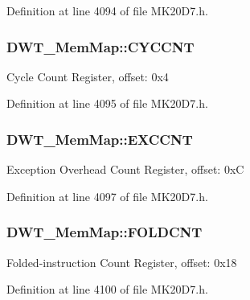 Definition at line 4094 of file M\+K20\+D7.\+h.

\subsubsection[{\texorpdfstring{C\+Y\+C\+C\+NT}{CYCCNT}}]{ D\+W\+T\+\_\+\+Mem\+Map\+::\+C\+Y\+C\+C\+NT}\hypertarget{struct_d_w_t___mem_map_adf38ec6a1c7381ff5e894b4f2fc2af1e}{}\label{struct_d_w_t___mem_map_adf38ec6a1c7381ff5e894b4f2fc2af1e}
Cycle Count Register, offset\+: 0x4 

Definition at line 4095 of file M\+K20\+D7.\+h.

\subsubsection[{\texorpdfstring{E\+X\+C\+C\+NT}{EXCCNT}}]{ D\+W\+T\+\_\+\+Mem\+Map\+::\+E\+X\+C\+C\+NT}\hypertarget{struct_d_w_t___mem_map_ae76c95a5c70db8790d92dbf9e404e3aa}{}\label{struct_d_w_t___mem_map_ae76c95a5c70db8790d92dbf9e404e3aa}
Exception Overhead Count Register, offset\+: 0xC 

Definition at line 4097 of file M\+K20\+D7.\+h.

\subsubsection[{\texorpdfstring{F\+O\+L\+D\+C\+NT}{FOLDCNT}}]{ D\+W\+T\+\_\+\+Mem\+Map\+::\+F\+O\+L\+D\+C\+NT}\hypertarget{struct_d_w_t___mem_map_a74e31352303671690d8a8e173fae836e}{}\label{struct_d_w_t___mem_map_a74e31352303671690d8a8e173fae836e}
Folded-\/instruction Count Register, offset\+: 0x18 

Definition at line 4100 of file M\+K20\+D7.\+h.

